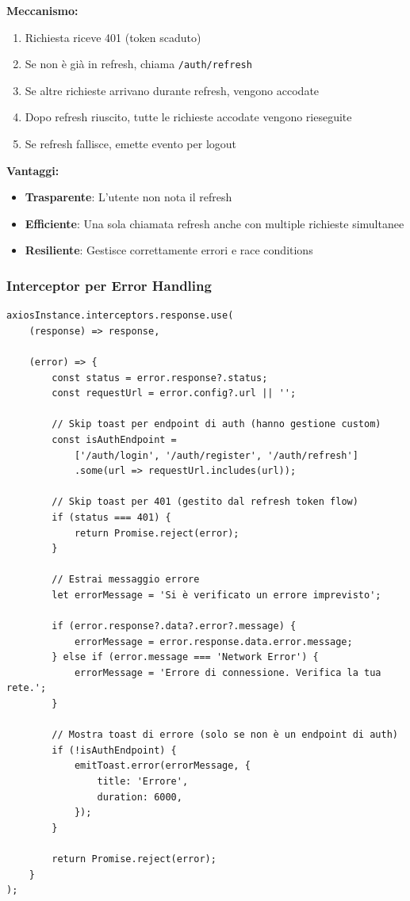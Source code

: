 \documentclass[11pt,a4paper]{article}
\newcommand{\code}[1]{\texttt{#1}}
\begin{document}
\textbf{Meccanismo:}
\begin{enumerate}
    \item Richiesta riceve 401 (token scaduto)
    \item Se non è già in refresh, chiama \code{/auth/refresh}
    \item Se altre richieste arrivano durante refresh, vengono accodate
    \item Dopo refresh riuscito, tutte le richieste accodate vengono rieseguite
    \item Se refresh fallisce, emette evento per logout
\end{enumerate}

\textbf{Vantaggi:}
\begin{itemize}
    \item \textbf{Trasparente}: L'utente non nota il refresh
    \item \textbf{Efficiente}: Una sola chiamata refresh anche con multiple richieste simultanee
    \item \textbf{Resiliente}: Gestisce correttamente errori e race conditions
\end{itemize}

\subsubsection{Interceptor per Error Handling}

\begin{lstlisting}[caption=Interceptor Error Handling Centralizzato]
axiosInstance.interceptors.response.use(
    (response) => response,
    
    (error) => {
        const status = error.response?.status;
        const requestUrl = error.config?.url || '';
        
        // Skip toast per endpoint di auth (hanno gestione custom)
        const isAuthEndpoint = 
            ['/auth/login', '/auth/register', '/auth/refresh']
            .some(url => requestUrl.includes(url));
        
        // Skip toast per 401 (gestito dal refresh token flow)
        if (status === 401) {
            return Promise.reject(error);
        }

        // Estrai messaggio errore
        let errorMessage = 'Si è verificato un errore imprevisto';
        
        if (error.response?.data?.error?.message) {
            errorMessage = error.response.data.error.message;
        } else if (error.message === 'Network Error') {
            errorMessage = 'Errore di connessione. Verifica la tua rete.';
        }

        // Mostra toast di errore (solo se non è un endpoint di auth)
        if (!isAuthEndpoint) {
            emitToast.error(errorMessage, {
                title: 'Errore',
                duration: 6000,
            });
        }

        return Promise.reject(error);
    }
);
\end{lstlisting}
\end{document}
